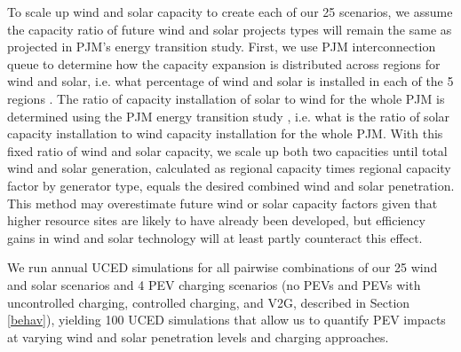 \documentclass[9pt,twocolumn,twoside,lineno]{pnas-new}
\begin{document}
{To scale up wind and solar capacity to create each of our 25 scenarios, we assume the capacity ratio of future wind and solar projects types will remain the same as projected in PJM's energy transition study\cite{pjm_energy_2021}. 
First, we use PJM interconnection queue to determine how the capacity expansion is distributed across regions for wind and solar, i.e. what percentage of wind and solar is installed in each of the 5 regions \cite{noauthor_pjm_nodate-4}. 
The ratio of capacity installation of solar to wind for the whole PJM is determined using the PJM energy transition study \cite{pjm_energy_2021}, i.e. what is the ratio of solar capacity installation to wind capacity installation for the whole PJM. With this fixed ratio of wind and solar capacity, we scale up both two capacities until total wind and solar generation, calculated as regional capacity times regional capacity factor by generator type, equals the desired combined wind and solar penetration. 
This method may overestimate future wind or solar capacity factors given that higher resource sites are likely to have already been developed, but efficiency gains in wind and solar technology will at least partly counteract this effect. 

We run annual UCED simulations for all pairwise combinations of our 25 wind and solar scenarios and 4 PEV charging scenarios (no PEVs and PEVs with uncontrolled charging, controlled charging, and V2G, described in Section \ref{behav}), yielding 100 UCED simulations that allow us to quantify PEV impacts at varying wind and solar penetration levels and charging approaches. 


}
\end{document}
